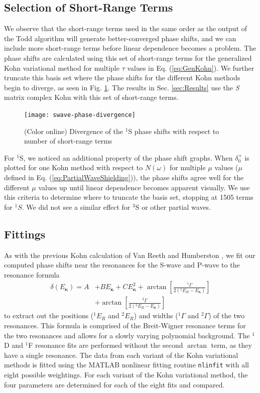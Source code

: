\documentclass[preprint,showpacs,preprintnumbers,amsmath,amssymb,longbibliography,pra,aps]{revtex4-1}
\begin{document}
\subsection{Selection of Short-Range Terms}
\label{sec:Truncation}
We observe that the short-range terms used in the same order as the output of the Todd algorithm will generate better-converged phase shifts, and we can include more short-range terms before linear dependence becomes a problem. The phase shifts are calculated using this set of short-range terms for the generalized Kohn variational method for multiple $\tau$ values in Eq. (\ref{eq:GenKohn}). We further truncate this basis set where the phase shifts for the different Kohn methods begin to diverge, as seen in Fig. \ref{fig:swave-phase-divergence}. The results in Sec. \ref{sec:Results} use the \emph{S} matrix complex Kohn with this set of short-range terms.

\begin{figure}[H]
	\centering
	\texttt{[image: swave-phase-divergence]}
	\caption{(Color online) Divergence of the $^1$S phase shifts with respect to number of short-range terms}
	\label{fig:swave-phase-divergence}
\end{figure}

For $^1$S, we noticed an additional property of the phase shift graphs. When $\delta_0^+$ is plotted for one Kohn method with respect to $N(\omega)$ for multiple $\mu$ values ($\mu$ defined in Eq. (\ref{eq:PartialWaveShielding})), the phase shifts agree well for the different $\mu$ values up until linear dependence becomes apparent visually. We use this criteria to determine where to truncate the basis set, stopping at 1505 terms for $^1S$. We did not see a similar effect for $^3$S or other partial waves.

\subsection{Fittings}
As with the previous Kohn calculation of Van Reeth and Humberston \cite{VanReeth2004}, we fit our computed phase shifts near the resonances for the S-wave and P-wave to the resonance formula
\begin{align}
\label{eq:ResonanceFit}
\delta(E_{\bm \kappa}) = A &+ B E_{\bm \kappa} + C E_{\bm \kappa}^2 + \arctan \left[ \frac{^1\Gamma}{2(^1E_R - E_{\bm \kappa})} \right]  \nonumber \\
& + \arctan \left[ \frac{^2\Gamma}{2(^2E_R - E_{\bm \kappa})} \right]
\end{align}
to extract out the positions ($^1E_R$ and $^2E_R$) and widths
($^1\Gamma$ and $^2\Gamma$) of the two resonances. 
This formula is comprised of the Breit-Wigner resonance
terms \cite{Breit1936,Macek1970} for the two resonances and allows for a slowly varying polynomial
background. The $^1$D and $^1$F resonance fits are performed without the second $\arctan$ term, as they have a single resonance. 
The data from each variant of the Kohn variational methods is fitted using the MATLAB \cite{MATLAB} nonlinear fitting routine \texttt{nlinfit} with all eight possible weightings.
For each variant of the Kohn variational method, the four parameters are determined for each of the eight fits and compared.
\end{document}
